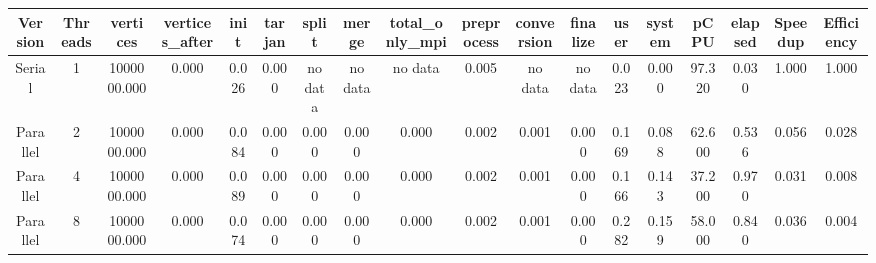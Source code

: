 \begin{tabular}{|c|c|c|c|c|c|c|c|c|c|c|c|c|c|c|c|c|c|}
\toprule
 Version &  Threads &    vertices &  vertices\_after &  init &  tarjan &   split &   merge & total\_only\_mpi &  preprocess & conversion & finalize &  user &  system &   pCPU &  elapsed &  Speedup &  Efficiency \\
\midrule
  Serial &        1 & 1000000.000 &           0.000 & 0.026 &   0.000 & no data & no data &        no data &       0.005 &    no data &  no data & 0.023 &   0.000 & 97.320 &    0.030 &    1.000 &       1.000 \\
Parallel &        2 & 1000000.000 &           0.000 & 0.084 &   0.000 &   0.000 &   0.000 &          0.000 &       0.002 &      0.001 &    0.000 & 0.169 &   0.088 & 62.600 &    0.536 &    0.056 &       0.028 \\
Parallel &        4 & 1000000.000 &           0.000 & 0.089 &   0.000 &   0.000 &   0.000 &          0.000 &       0.002 &      0.001 &    0.000 & 0.166 &   0.143 & 37.200 &    0.970 &    0.031 &       0.008 \\
Parallel &        8 & 1000000.000 &           0.000 & 0.074 &   0.000 &   0.000 &   0.000 &          0.000 &       0.002 &      0.001 &    0.000 & 0.282 &   0.159 & 58.000 &    0.840 &    0.036 &       0.004 \\
\bottomrule
\end{tabular}
